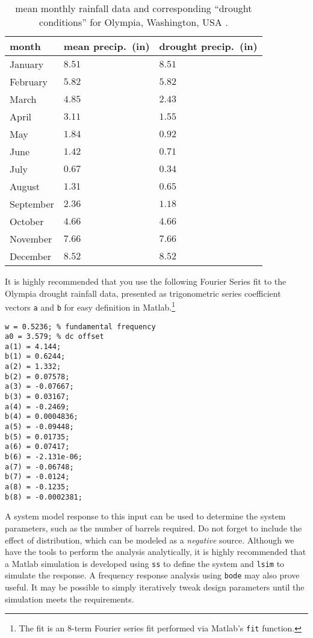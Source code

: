 \documentclass[dynamic_systems.tex]{subfiles}
\begin{document}
\begin{table}
\centering
\caption{mean monthly rainfall data and corresponding ``drought conditions'' for Olympia, Washington, USA \citep{thurston_noaa2017}.}
\label{tab:oly_rainfall}
\begin{tabular}{lll}
\toprule
month & mean precip.\ (in) & drought precip.\ (in) \\
\midrule
January & $8.51$  & $8.51$ \\
February & $5.82$ & $5.82$ \\
March & $4.85$ & $2.43$ \\
April & $3.11$ & $1.55$ \\
May & $1.84$ & $0.92$ \\
June & $1.42$ & $0.71$ \\
July & $0.67$ & $0.34$ \\
August & $1.31$ & $0.65$ \\
September & $2.36$ & $1.18$ \\
October & $4.66$ & $4.66$ \\
November & $7.66$ & $7.66$ \\
December & $8.52$ & $8.52$ \\
\bottomrule
\end{tabular}
\end{table}


It is highly recommended that you use the following Fourier Series fit to the Olympia drought rainfall data, presented as trigonometric series coefficient vectors \texttt{a} and \texttt{b} for easy definition in Matlab.\footnote{The fit is an $8$-term Fourier series fit performed via Matlab's \texttt{fit} function.}
\begin{verbatim}
w = 0.5236; % fundamental frequency
a0 = 3.579; % dc offset
a(1) = 4.144;
b(1) = 0.6244;
a(2) = 1.332;
b(2) = 0.07578;
a(3) = -0.07667;
b(3) = 0.03167;
a(4) = -0.2469;
b(4) = 0.0004836;
a(5) = -0.09448;
b(5) = 0.01735;
a(6) = 0.07417;
b(6) = -2.131e-06;
a(7) = -0.06748;
b(7) = -0.0124;
a(8) = -0.1235;
b(8) = -0.0002381;
\end{verbatim}

A system model response to this input can be used to determine the system parameters, such as the number of barrels required.
Do not forget to include the effect of distribution, which can be modeled as a \emph{negative} source.
Although we have the tools to perform the analysis analytically, it is highly recommended that a Matlab simulation is developed using \texttt{ss} to define the system and \texttt{lsim} to simulate the response.
A frequency response analysis using \texttt{bode} may also prove useful.
It may be possible to simply iteratively tweak design parameters until the simulation meets the requirements.
\tags{}
\end{document}
